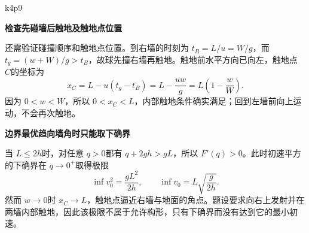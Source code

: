 \begin{drillsolution}{k4p9}
\par\medskip{}\noindent\textbf{检查先碰墙后触地及触地点位置}\par\nobreak
还需验证碰撞顺序和触地点位置。到右墙的时刻为 $t_B=L/u=W/g$，而 $t_g=(w+W)/g>t_B$，故球先撞右墙再触地。触地前水平方向已向左，触地点 $C$的坐标为
\[x_C=L-u(t_g-t_B)
     =L-\frac{uw}{g}=L\left(1-\frac wW\right).\]
因为 $0<w<W$，所以 $0<x_C<L$，内部触地条件确实满足；回到左墙前向上运动，不会再次触地。



\par\medskip{}\noindent\textbf{边界最优趋向墙角时只能取下确界}\par\nobreak
当 $L\le2h$时，对任意 $q>0$都有 $q+2gh>gL$，所以 $F'(q)>0$。此时初速平方的下确界在 $q\to0^+$取得极限
\[\inf v_0^2=\frac{gL^2}{2h},\qquad
\boxed{\inf v_0=L\sqrt{\frac{g}{2h}}}.\]
然而 $w\to0$时 $x_C\to L$，触地点逼近右墙与地面的角点。题设要求向右上发射并在两墙内部触地，因此该极限不属于允许构形，只有下确界而没有达到它的最小初速。\end{drillsolution}
